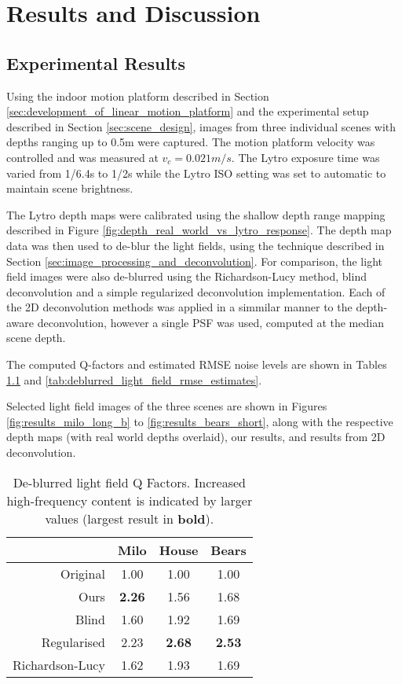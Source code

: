 
\chapter{Results and Discussion}
\label{chap:results_and_discussion}

\section{Experimental Results}
\label{sec:experimental_results}

Using the indoor motion platform described in Section \ref{sec:development_of_linear_motion_platform} and the experimental setup described in Section \ref{sec:scene_design}, images from three individual scenes with depths ranging up to \nicetilde0.5m were captured.
The motion platform velocity was controlled and was measured at $v_c = 0.021m/s$.
The Lytro exposure time was varied from 1/6.4s to 1/2s while the Lytro ISO setting was set to automatic to maintain scene brightness.

The Lytro depth maps were calibrated using the shallow depth range mapping described in Figure \ref{fig:depth_real_world_vs_lytro_response}.
The depth map data was then used to de-blur the light fields, using the technique described in Section \ref{sec:image_processing_and_deconvolution}.
For comparison, the light field images were also de-blurred using the Richardson-Lucy method, blind deconvolution and a simple regularized deconvolution implementation.
Each of the 2D deconvolution methods was applied in a simmilar manner to the depth-aware deconvolution, however a single PSF was used, computed at the median scene depth.

The computed Q-factors and estimated RMSE noise levels are shown in Tables \ref{tab:deblurred_light_field_q_factors} and \ref{tab:deblurred_light_field_rmse_estimates}.

Selected light field images of the three scenes are shown in Figures \ref{fig:results_milo_long_b} to \ref{fig:results_bears_short}, along with the respective depth maps (with real world depths overlaid), our results, and results from 2D deconvolution.


\begin{table}[h]
\centering
\caption[De-blurred light field Q Factors]{
De-blurred light field Q Factors.
Increased high-frequency content is indicated by larger values (largest result in \textbf{bold}).
}
\label{tab:deblurred_light_field_q_factors}
\begin{tabular}[h]{r | c c c}
                & Milo          & House          & Bears         \\
\hline
Original        & 1.00          & 1.00           & 1.00          \\
Ours            & \textbf{2.26} & 1.56           & 1.68          \\
Blind           & 1.60          & 1.92           & 1.69          \\
Regularised     & 2.23          & \textbf{2.68}  & \textbf{2.53} \\
Richardson-Lucy & 1.62          & 1.93           & 1.69          \\
\end{tabular}
\end{table}



